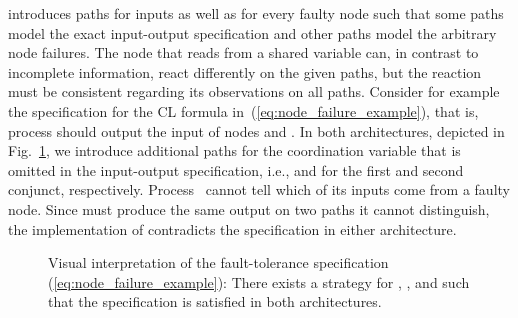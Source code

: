 \documentclass{LMCS}
\theoremstyle{plain}\newtheorem{theorem}[thm]{Theorem}
\theoremstyle{plain}\newtheorem{lemma}[thm]{Lemma}
\theoremstyle{plain}\newtheorem{proposition}[thm]{Proposition}
\theoremstyle{plain}\newtheorem{corollary}[thm]{Corollary}
\theoremstyle{definition}\newtheorem{definition}{Definition}[section]
\begin{document}
introduces paths for inputs as well as for every faulty node such that some paths model the exact input-output specification and other paths model the arbitrary node failures.
The node that reads from a shared variable can, in contrast to incomplete information, react differently on the given paths, but the reaction must be consistent regarding its observations on all paths.
Consider for example the specification  for the CL formula in~(\ref{eq:node_failure_example}), that is, process  should output the input  of nodes  and .
In both architectures, depicted in Fig.~\ref{fig:fault_architectures}, we introduce additional paths for the coordination variable that is omitted in the input-output specification, i.e.,  and  for the first and second conjunct, respectively.
Process~ cannot tell which of its inputs come from a faulty node.
Since  must produce the same output on two paths it cannot distinguish, the implementation of  contradicts the specification in either architecture.
\begin{figure}[t]
\centering
{}\qquad {}
\caption[]{Visual interpretation of the fault-tolerance specification (\ref{eq:node_failure_example}): There exists a strategy for , , and  such that the specification is satisfied in both architectures.}
\label{fig:fault_architectures}
\end{figure}
\end{document}
